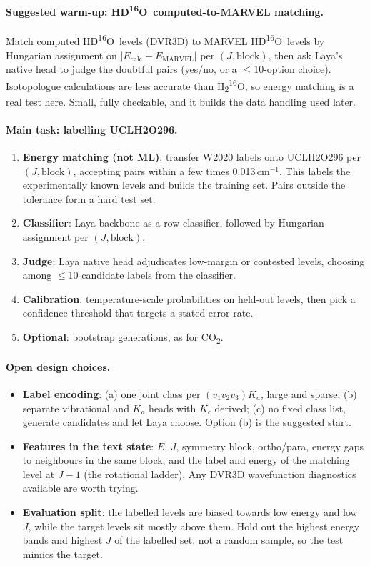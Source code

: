 \documentclass[11pt,a4paper]{article}
\newcommand{\water}{H\textsubscript{2}\textsuperscript{16}O}
\newcommand{\hdo}{HD\textsuperscript{16}O}
\newcommand{\cotwo}{CO\textsubscript{2}}
\begin{document}
\paragraph{Suggested warm-up: \hdo\ computed-to-MARVEL matching.} Match computed \hdo\ levels (DVR3D) to MARVEL \hdo\ levels by Hungarian assignment on $|E_\text{calc} - E_\text{MARVEL}|$ per $(J, \text{block})$, then ask Laya's native head to judge the doubtful pairs (yes/no, or a $\le$10-option choice). Isotopologue calculations are less accurate than \water, so energy matching is a real test here. Small, fully checkable, and it builds the data handling used later.

\paragraph{Main task: labelling UCLH2O296.}
\begin{enumerate}
  \item \textbf{Energy matching (not ML)}: transfer W2020 labels onto UCLH2O296 per $(J, \text{block})$, accepting pairs within a few times 0.013\,cm$^{-1}$. This labels the experimentally known levels and builds the training set. Pairs outside the tolerance form a hard test set.
  \item \textbf{Classifier}: Laya backbone as a row classifier, followed by Hungarian assignment per $(J, \text{block})$.
  \item \textbf{Judge}: Laya native head adjudicates low-margin or contested levels, choosing among $\le$10 candidate labels from the classifier.
  \item \textbf{Calibration}: temperature-scale probabilities on held-out levels, then pick a confidence threshold that targets a stated error rate.
  \item \textbf{Optional}: bootstrap generations, as for \cotwo.
\end{enumerate}

\paragraph{Open design choices.}
\begin{itemize}
  \item \textbf{Label encoding}: (a) one joint class per $(v_1 v_2 v_3) K_a$, large and sparse; (b) separate vibrational and $K_a$ heads with $K_c$ derived; (c) no fixed class list, generate candidates and let Laya choose. Option (b) is the suggested start.
  \item \textbf{Features in the text state}: $E$, $J$, symmetry block, ortho/para, energy gaps to neighbours in the same block, and the label and energy of the matching level at $J-1$ (the rotational ladder). Any DVR3D wavefunction diagnostics available are worth trying.
  \item \textbf{Evaluation split}: the labelled levels are biased towards low energy and low $J$, while the target levels sit mostly above them. Hold out the highest energy bands and highest $J$ of the labelled set, not a random sample, so the test mimics the target.
\end{itemize}
\end{document}
